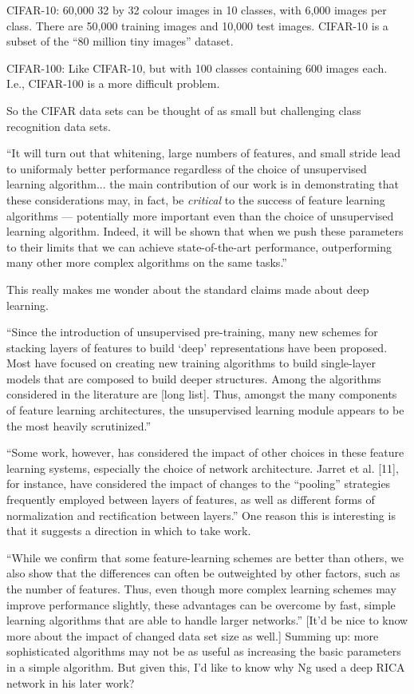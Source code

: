 \documentclass[12pt]{report}
\begin{document}
CIFAR-10: 60,000 32 by 32 colour images in 10 classes, with 6,000
images per class.  There are 50,000 training images and 10,000 test
images.  CIFAR-10 is a subset of the ``80 million tiny images''
dataset.

CIFAR-100: Like CIFAR-10, but with 100 classes containing 600 images
each.  I.e., CIFAR-100 is a more difficult problem.

So the CIFAR data sets can be thought of as small but challenging
class recognition data sets.

``It will turn out that whitening, large numbers of features, and
small stride lead to uniformaly better performance regardless of the
choice of unsupervised learning algorithm... the main contribution of
our work is in demonstrating that these considerations may, in fact,
be \emph{critical} to the success of feature learning algorithms ---
potentially more important even than the choice of unsupervised
learning algorithm.  Indeed, it will be shown that when we push these
parameters to their limits that we can achieve state-of-the-art
performance, outperforming many other more complex algorithms on the
same tasks.''

This really makes me wonder about the standard claims made about deep
learning.

``Since the introduction of unsupervised pre-training, many new
schemes for stacking layers of features to build `deep'
representations have been proposed.  Most have focused on creating new
training algorithms to build single-layer models that are composed to
build deeper structures.  Among the algorithms considered in the
literature are [long list].  Thus, amongst the many components of
feature learning architectures, the unsupervised learning module
appears to be the most heavily scrutinized.''

``Some work, however, has considered the impact of other choices in
these feature learning systems, especially the choice of network
architecture.  Jarret et al. [11], for instance, have considered the
impact of changes to the ``pooling'' strategies frequently employed
between layers of features, as well as different forms of
normalization and rectification between layers.''  One reason this is
interesting is that it suggests a direction in which to take work.

``While we confirm that some feature-learning schemes are better than
others, we also show that the differences can often be outweighted by
other factors, such as the number of features.  Thus, even though more
complex learning schemes may improve performance slightly, these
advantages can be overcome by fast, simple learning algorithms that
are able to handle larger networks.''  [It'd be nice to know more
about the impact of changed data set size as well.]  Summing up: more
sophisticated algorithms may not be as useful as increasing the basic
parameters in a simple algorithm.  But given this, I'd like to know
why Ng used a deep RICA network in his later work?
\end{document}
